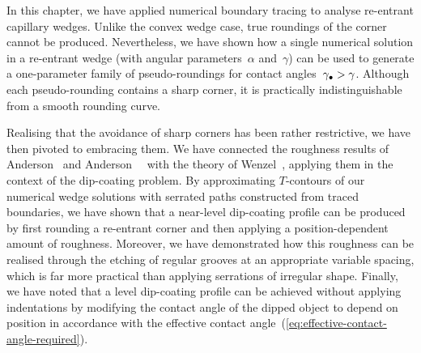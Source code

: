 In this chapter, we have applied numerical boundary tracing
to analyse re-entrant capillary wedges.
Unlike the convex wedge case,
true roundings of the corner cannot be produced.
Nevertheless, we have shown how
a single numerical solution in a re-entrant wedge
(with angular parameters~$\alpha$ and~$\gamma$)
can be used to generate a one-parameter family
of pseudo-roundings for contact angles~$\gamma_\bullet > \gamma$.
Although each pseudo-rounding contains a sharp corner,
it is practically indistinguishable from a smooth rounding curve.

Realising that the avoidance of sharp corners has been rather restrictive,
we have then pivoted to embracing them.
We have connected the roughness results of
Anderson~\cite{anderson-2002-thesis-boundary-tracing-pdes}
and Anderson~\etal~\cite{anderson-2006-exact-solutions-laplace-young}
with the theory of Wenzel~\cite{wenzel-1936-resistance-solid-surfaces-wetting},
applying them in the context of the dip-coating problem.
By approximating $T$-contours of our numerical wedge solutions
with serrated paths constructed from traced boundaries,
we have shown that a near-level dip-coating profile can be produced
by first rounding a re-entrant corner
and then applying a position-dependent amount of roughness.
Moreover, we have demonstrated how this roughness can be realised
through the etching of regular grooves at an appropriate variable spacing,
which is far more practical than applying serrations of irregular shape.
Finally, we have noted that
a level dip-coating profile can be achieved without applying indentations
by modifying the contact angle of the dipped object
to depend on position in accordance with
the effective contact angle~(\ref{eq:effective-contact-angle-required}).
